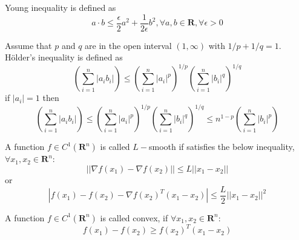     \begin{definition}\label{def:2.21}
        \cite{HK2001} Young inequality is defined as
        \begin{equation}\label{eq:2.3.1}
            a \cdot b \leq \frac{\epsilon}{2}a^2 + \frac{1}{2\epsilon}b^2, \forall a,b \in \mathbf{R}, \forall \epsilon > 0
        \end{equation}
    \end{definition}
    
    \begin{definition}\label{def:2.22}
        \cite{folland2013real} Assume that $p$ and $q$ are in the open interval $(1,\infty)$ with $1/p + 1/q = 1$. Hölder's inequality is defined as
        \begin{equation}\label{eq:2.3.2}
            \left(\sum_{i = 1}^{n} |a_i b_i|\right) \leq \left(\sum_{i = 1}^{n} |a_i|^p\right)^{1/p} \left(\sum_{i = 1}^{n} |b_i|^q\right)^{1/q} 
        \end{equation}
        if $|a_i| = 1$ then
        \begin{equation*}
            \left(\sum_{i = 1}^{n} |a_i b_i|\right) \leq \left(\sum_{i = 1}^{n} |a_i|^p\right)^{1/p} \left(\sum_{i = 1}^{n} |b_i|^q\right)^{1/q}\leq n^{1-p}\left(\sum_{i = 1}^{n} |b_i|^p\right)
        \end{equation*}
    \end{definition}
    
    \begin{definition}\label{def:2.23}
        \cite{JBI1991} A function $f \in C^1({\mathbf{R}^n})$ is called $L-$smooth if satisfies the below inequality, \hspace{1.0mm}$\forall x_1,x_2 \in \mathbf{R}^n$:
        \begin{equation}\label{eq:2.3.3}
            ||\nabla f(x_1) -\nabla f(x_2)|| \leq L ||x_1 - x_2||
        \end{equation}
        or
        \begin{equation}\label{eq:2.3.4}
            |f(x_1) - f(x_2) - \nabla f(x_2)^T(x_1 - x_2)| \leq \frac{L}{2}||x_1 - x_2||^2
        \end{equation}
    \end{definition}
    
    \begin{definition}\label{def:2.24}
        \cite{JBI1991} A function $f \in C^1({\mathbf{R}^n})$ is called convex, if \hspace{1.0mm}$\forall x_1,x_2 \in \mathbf{R}^n$:
        \begin{equation}\label{eq:2.3.5}
            f(x_1) - f(x_2) \geq f(x_2)^T(x_1 - x_2) 
        \end{equation}
    \end{definition}
    
